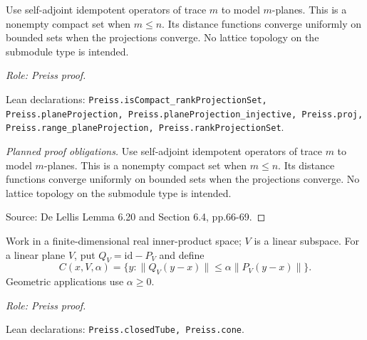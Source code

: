 \begin{lemma}
\label{lem:grassmannian}








Use self-adjoint idempotent operators of trace $m$ to model $m$-planes.
This is a nonempty compact set when $m\leq n$.
Its distance functions converge uniformly on bounded sets when the projections
converge. No lattice topology on the submodule type is intended.
\par\emph{Role: Preiss proof.}
\par Lean declarations: \texttt{Preiss.isCompact\_rankProjectionSet, Preiss.planeProjection, Preiss.planeProjection\_injective, Preiss.proj, Preiss.range\_planeProjection, Preiss.rankProjectionSet}.
\end{lemma}
\begin{proof}[Planned proof obligations]
Use self-adjoint idempotent operators of trace $m$ to model $m$-planes.
This is a nonempty compact set when $m\leq n$.
Its distance functions converge uniformly on bounded sets when the projections
converge. No lattice topology on the submodule type is intended.
\par Source: De Lellis Lemma 6.20 and Section 6.4, pp.66-69.
\end{proof}

\begin{definition}
\label{def:cone}








Work in a finite-dimensional real inner-product space; \(V\) is a linear subspace.
For a linear plane \(V\), put \(Q_V=\mathrm{id}-P_V\) and define
\[
 C(x,V,\alpha)=\{y:\|Q_V(y-x)\|\leq\alpha\|P_V(y-x)\|\}.
\]
Geometric applications use \(\alpha\geq0\).
\par\emph{Role: Preiss proof.}
\par Lean declarations: \texttt{Preiss.closedTube, Preiss.cone}.
\end{definition}

